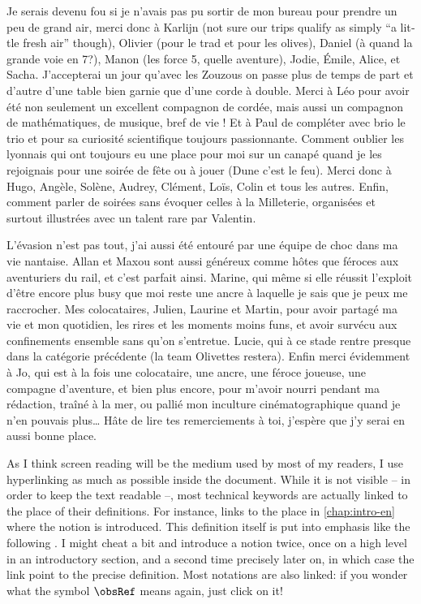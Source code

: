 Je serais devenu fou si je n’avais pas pu sortir de mon bureau pour prendre un peu de grand
air, merci donc à Karlijn (\foreignlanguage{english}{not sure our trips
qualify as simply “a little fresh air” though}),
Olivier (pour le trad et pour les olives), Daniel (à quand la grande voie en 7?),
Manon (les force 5, quelle aventure), Jodie, Émile, Alice,
et Sacha. J’accepterai un jour qu’avec les Zouzous on passe plus de temps
de part et d’autre d’une table bien garnie que d’une corde à double.
Merci à Léo pour avoir été non seulement un excellent compagnon de cordée, mais aussi un
compagnon de mathématiques, de musique, bref de vie ! Et à Paul de compléter avec brio
le trio et pour sa curiosité scientifique toujours passionnante.
Comment oublier les lyonnais qui ont toujours eu une place pour moi sur un canapé
quand je les rejoignais pour une soirée de fête ou à jouer (Dune c’est le feu).
Merci donc à Hugo, Angèle, Solène, Audrey, Clément, Loïs, Colin
et tous les autres.
Enfin, comment parler de soirées sans évoquer celles à la Milleterie, organisées et
surtout illustrées avec un talent rare par Valentin.

L’évasion n’est pas tout, j’ai aussi été entouré par une équipe de choc dans ma vie nantaise.
Allan et Maxou sont aussi généreux comme hôtes que féroces aux aventuriers du rail, et
c’est parfait ainsi.
Marine, qui même si elle réussit l’exploit d’être encore plus busy que moi reste une ancre
à laquelle je sais que je peux me raccrocher.
Mes colocataires, Julien, Laurine et Martin, pour avoir partagé ma
vie et mon quotidien, les rires et les moments moins funs, et avoir survécu aux confinements
ensemble sans qu’on s’entretue. Lucie, qui à ce stade rentre
presque dans la catégorie précédente (la team Olivettes restera).
Enfin merci évidemment à Jo, qui est à la fois une colocataire, une ancre, une féroce joueuse,
une compagne d’aventure, et bien plus encore, pour m’avoir nourri pendant ma rédaction,
traîné à la mer, ou pallié mon inculture cinématographique quand je n’en pouvais plus…
Hâte de lire tes remerciements à toi, j’espère que j’y serai en aussi bonne place.



As I think screen reading will be the medium
used by most of my readers, I use hyperlinking as much as possible
inside the document.
While it is not visible – in order to keep the text readable –,
most technical keywords are actually linked to the
place of their definitions. For instance,  links to
the place in \cref{chap:intro-en} where the notion is introduced.
This definition itself is put into emphasis like the following .
I might cheat a bit and introduce a notion twice, once on a high level in an introductory
section, and a second time precisely later on, in which case the link point to the precise
definition. Most notations are also linked: if you wonder what the symbol $\obsRef$
means again, just click on it!

